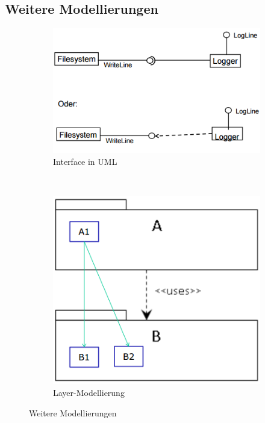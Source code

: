 \subsection{Weitere Modellierungen}

\begin{figure}[h!]
	\centering
	\begin{subfigure}[b]{0.4\textwidth}
		\includegraphics[width=\textwidth]{fig/interface-uml}
		\caption{Interface in UML}
		\label{fig:interface-uml}
	\end{subfigure}
	~
	\begin{subfigure}[b]{0.4\textwidth}
		\includegraphics[width=\textwidth]{fig/layer-modellierung}
		\caption{Layer-Modellierung}
		\label{fig:layer-modellierung}
	\end{subfigure}
	\caption{Weitere Modellierungen}
	\label{fig:weitere-modellierungen}
\end{figure}


